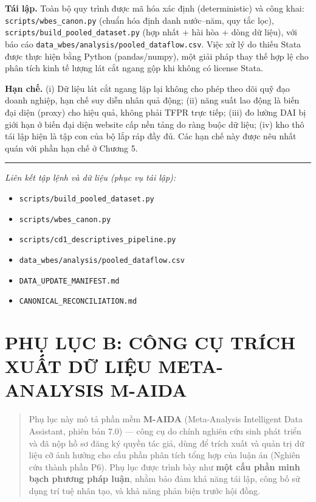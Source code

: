 \documentclass[
  a4paper,
  13pt]{extreport}
\providecommand{\tightlist}{%
  \setlength{\itemsep}{0pt}\setlength{\parskip}{0pt}}
\begin{document}
\textbf{Tái lập.} Toàn bộ quy trình được mã hóa xác định (deterministic)
và công khai: \texttt{scripts/wbes\_canon.py} (chuẩn hóa định danh
nước--năm, quy tắc lọc), \texttt{scripts/build\_pooled\_dataset.py} (hợp
nhất + hài hòa + dòng dữ liệu), với báo cáo
\texttt{data\_wbes/analysis/pooled\_dataflow.csv}. Việc xử lý do thiếu
Stata được thực hiện bằng Python (pandas/numpy), một giải pháp thay thế
hợp lệ cho phân tích kinh tế lượng lát cắt ngang gộp khi không có
license Stata.

\textbf{Hạn chế.} (i) Dữ liệu lát cắt ngang lặp lại không cho phép theo
dõi quỹ đạo doanh nghiệp, hạn chế suy diễn nhân quả động; (ii) năng suất
lao động là biến đại diện (proxy) cho hiệu quả, không phải TFPR trực
tiếp; (iii) đo lường DAI bị giới hạn ở biến đại diện website cấp nền
tảng do ràng buộc dữ liệu; (iv) kho thô tái lập hiện là tập con của bộ
lắp ráp đầy đủ. Các hạn chế này được nêu nhất quán với phần hạn chế ở
Chương 5.

\begin{center}\rule{0.5\linewidth}{0.5pt}\end{center}

\emph{Liên kết tập lệnh và dữ liệu (phục vụ tái lập):}

\begin{itemize}
\tightlist
\item
  \texttt{scripts/build\_pooled\_dataset.py}
\item
  \texttt{scripts/wbes\_canon.py}
\item
  \texttt{scripts/cd1\_descriptives\_pipeline.py}
\item
  \texttt{data\_wbes/analysis/pooled\_dataflow.csv}
\item
  \texttt{DATA\_UPDATE\_MANIFEST.md}
\item
  \texttt{CANONICAL\_RECONCILIATION.md}
\end{itemize}

\newpage

\hypertarget{phux1ee5-lux1ee5c-b-cuxf4ng-cux1ee5-truxedch-xuux1ea5t-dux1eef-liux1ec7u-meta-analysis-m-aida}{%
\chapter{PHỤ LỤC B: CÔNG CỤ TRÍCH XUẤT DỮ LIỆU META-ANALYSIS
M-AIDA}\label{phux1ee5-lux1ee5c-b-cuxf4ng-cux1ee5-truxedch-xuux1ea5t-dux1eef-liux1ec7u-meta-analysis-m-aida}}

\begin{quote}
Phụ lục này mô tả phần mềm \textbf{M-AIDA} (Meta-Analysis Intelligent
Data Assistant, phiên bản 7.0) --- công cụ do chính nghiên cứu sinh phát
triển và đã nộp hồ sơ đăng ký quyền tác giả, dùng để trích xuất và quản
trị dữ liệu cỡ ảnh hưởng cho cấu phần phân tích tổng hợp của luận án
(Nghiên cứu thành phần P6). Phụ lục được trình bày như \textbf{một cấu
phần minh bạch phương pháp luận}, nhằm bảo đảm khả năng tái lập, công bố
sử dụng trí tuệ nhân tạo, và khả năng phản biện trước hội đồng.
\end{quote}
\end{document}
